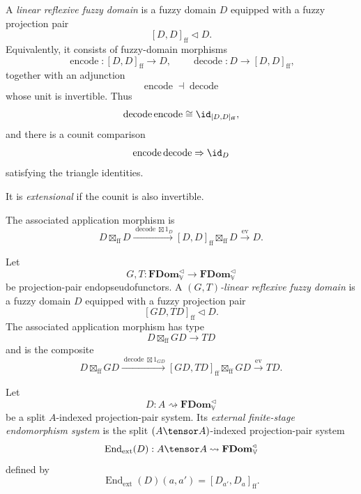 \begin{definition}
\label{def:linear-reflexive-fuzzy-domain-ff}
A \emph{linear reflexive fuzzy domain} is a fuzzy domain \(D\) equipped with a
fuzzy projection pair
\[
    [D,D]_{\mathrm{ff}}\triangleleft D.
\]
Equivalently, it consists of fuzzy-domain morphisms
\[
    \operatorname{encode}:[D,D]_{\mathrm{ff}}\to D,
    \qquad
    \operatorname{decode}:D\to [D,D]_{\mathrm{ff}},
\]
together with an adjunction
\[
    \operatorname{encode}\dashv \operatorname{decode}
\]
whose unit is invertible.  Thus
\[
    \operatorname{decode}\operatorname{encode}
    \cong
    \id_{[D,D]_{\mathrm{ff}}},
\]
and there is a counit comparison
\[
    \operatorname{encode}\operatorname{decode}
    \Rightarrow
    \id_D
\]
satisfying the triangle identities.

It is \emph{extensional} if the counit is also invertible.
\end{definition}

The associated application morphism is
\[
    D\boxtimes_{\mathrm{ff}}D
    \xrightarrow{\operatorname{decode}\boxtimes 1_D}
    [D,D]_{\mathrm{ff}}\boxtimes_{\mathrm{ff}}D
    \xrightarrow{\operatorname{ev}}
    D.
\]

\begin{definition}
\label{def:mixed-linear-reflexive-fuzzy-domain-ff}
Let
\[
    G,T:\mathbf{FDom}_{\mathbb V}^{\triangleleft}
      \to
      \mathbf{FDom}_{\mathbb V}^{\triangleleft}
\]
be projection-pair endopseudofunctors.  A
\emph{\((G,T)\)-linear reflexive fuzzy domain} is a fuzzy domain \(D\) equipped
with a fuzzy projection pair
\[
    [GD,TD]_{\mathrm{ff}}\triangleleft D.
\]
The associated application morphism has type
\[
    D\boxtimes_{\mathrm{ff}}GD\to TD
\]
and is the composite
\[
    D\boxtimes_{\mathrm{ff}}GD
    \xrightarrow{\operatorname{decode}\boxtimes 1_{GD}}
    [GD,TD]_{\mathrm{ff}}\boxtimes_{\mathrm{ff}}GD
    \xrightarrow{\operatorname{ev}}
    TD.
\]
\end{definition}

\begin{definition}
\label{def:external-finite-stage-endomorphism-system}
Let
\[
    D:A\rightsquigarrow\mathbf{FDom}_{\mathbb V}^{\triangleleft}
\]
be a split \(A\)-indexed projection-pair system.  Its
\emph{external finite-stage endomorphism system} is the split
\((A\tensor A)\)-indexed projection-pair system
\[
    \operatorname{End}_{\mathrm{ext}}(D)
    :
    A\tensor A
    \rightsquigarrow
    \mathbf{FDom}_{\mathbb V}^{\triangleleft}
\]
defined by
\[
    \operatorname{End}_{\mathrm{ext}}(D)(a,a')
    =
    [D_{a'},D_a]_{\mathrm{ff}}.
\]
\end{definition}


